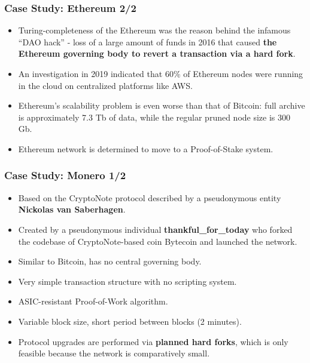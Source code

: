 \documentclass{beamer}
\begin{document}
\begin{frame}
  \frametitle{Case Study: Ethereum 2/2}
  \begin{itemize}
  \item Turing-completeness of the Ethereum was the reason behind the infamous
    ``DAO hack'' - loss of a large amount of funds in 2016 that caused
    \textbf{the Ethereum governing body to revert a transaction via a hard
      fork}.
  \item An investigation in 2019 indicated that 60\% of Ethereum nodes were
    running in the cloud on centralized platforms like AWS.
  \item Ethereum's scalability problem is even worse than that of Bitcoin: full
    archive is approximately 7.3 Tb of data, while the regular pruned node size
    is 300 Gb.
  \item Ethereum network is determined to move to a Proof-of-Stake system.
  \end{itemize}
\end{frame}

\begin{frame}
  \frametitle{Case Study: Monero 1/2}
  \begin{itemize}
  \item Based on the CryptoNote protocol described by a pseudonymous entity
    \textbf{Nickolas van Saberhagen}.
  \item Created by a pseudonymous individual \textbf{thankful\_for\_today} who
    forked the codebase of CryptoNote-based coin Bytecoin and launched the
    network.
  \item Similar to Bitcoin, has no central governing body.
  \item Very simple transaction structure with no scripting system.
  \item ASIC-resistant Proof-of-Work algorithm.
  \item Variable block size, short period between blocks (2 minutes).
  \item Protocol upgrades are performed via \textbf{planned hard forks}, which
    is only feasible because the network is comparatively small.
  \end{itemize}
\end{frame}
\end{document}
